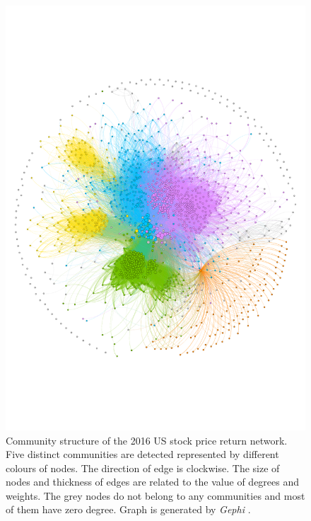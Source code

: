 \begin{figure}
	\begin{center}
		\includegraphics[width=14cm]{community_graph}
	\end{center}
	\caption{Community structure of the 2016 US stock price return network. Five distinct communities are detected represented by different colours of nodes. The direction of edge is  clockwise. The size of nodes and thickness of edges are related to the value of degrees and weights. The grey nodes do not belong to any communities and most of them have zero degree. Graph is generated by \textit{Gephi} \cite{ICWSM09154}.}
	\label{fig:community_graph}
\end{figure}

